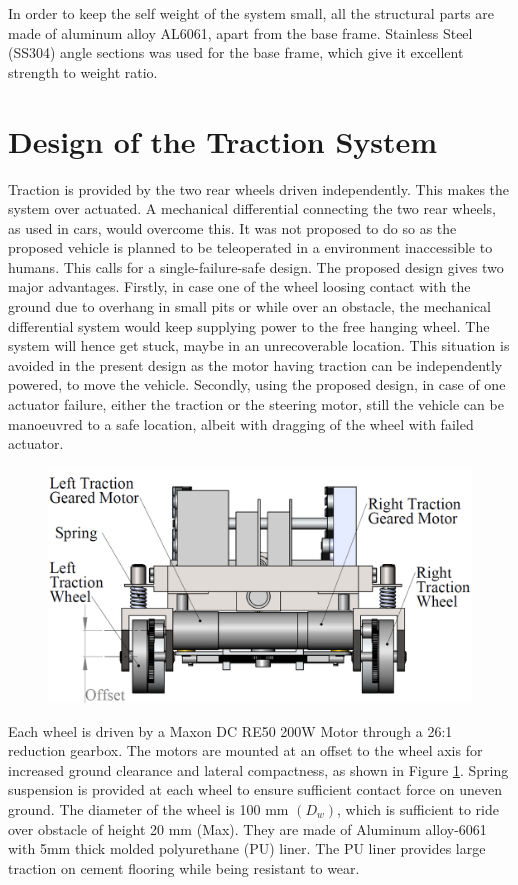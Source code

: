  In order to keep the self weight of the system small, all the  structural parts are made of aluminum alloy AL6061, apart from the base frame. Stainless Steel (SS304)  angle sections was used for the base frame, which give it  excellent strength to weight ratio. 

\section{Design of the Traction System}
Traction is provided by the two rear wheels driven independently. This makes the system over actuated. A mechanical differential connecting the two rear wheels, as used in cars,  would overcome this. It was not proposed to do so as the proposed vehicle is planned to be teleoperated in a environment inaccessible to humans. This calls for a single-failure-safe design. The proposed design gives two major advantages. 
Firstly, in case  one of the wheel loosing contact with the ground due to  overhang in small pits or while over an obstacle, the mechanical differential system would keep supplying power to the free hanging wheel. The system will hence get stuck, maybe in an unrecoverable location. This situation is avoided in the present design as the motor having traction can be independently powered, to move the vehicle.  
Secondly, using the proposed design, in case of one  actuator failure, either the traction or the steering motor, still the vehicle can be manoeuvred to a  safe location, albeit with dragging of the wheel with failed actuator.

 \begin{figure}[h]
	\centering
	\includegraphics[width=.7\linewidth,keepaspectratio]{Chapter3/fig/WheelOffset}
	\label{fig:tractionDrive}
\end{figure}

    Each wheel is driven by a  Maxon DC RE50 200W Motor through a 26:1 reduction gearbox. The motors are mounted at an offset to the wheel axis for increased ground clearance and lateral compactness, as shown in Figure \ref{fig:tractionDrive}. Spring suspension is provided at each wheel to ensure sufficient contact force on uneven  ground. The diameter of the wheel is 100 mm $(D_w)$, which is sufficient to ride over obstacle of height 20 mm (Max). They are made of Aluminum alloy-6061 with 5mm thick molded polyurethane (PU) liner. The PU liner provides large traction on cement flooring while being resistant to wear.
    
